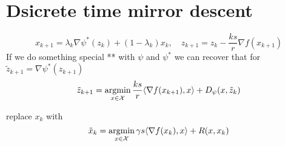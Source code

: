 \documentclass{article}
\newcommand{\argmin}{\operatornamewithlimits{argmin}}
\begin{document}
\section{Dsicrete time mirror descent}

\[ x_{k+1}  = \lambda_k \nabla \psi^*(z_k) + (1-\lambda_k) x_{k}, \quad z_{k+1} = z_k -\frac{ks}{r} \nabla f(x_{k+1}) \]
If we do something special ** with $\psi$ and $\psi^*$ we can recover that for $\tilde z_{k+1} = \nabla \psi^*(z_{k+1} )$
\[ \tilde z_{k+1} = \argmin_{x\in\mathcal{X}} \frac{ks}{r} \langle \nabla f(x_{k+1}), x \rangle + D_\psi (x, \tilde z_k)\]

replace $x_k$ with 
\[\tilde x_k = \argmin_{x\in\mathcal X} \gamma s \langle \nabla f(x_k), x \rangle + R(x,x_k)  \]
\end{document}

